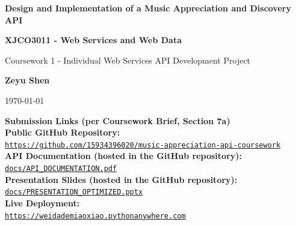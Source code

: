\documentclass[11pt,a4paper]{article}
\begin{document}
\begin{titlepage}
    \centering
    \vspace*{2cm}
    
    {\Huge\bfseries\color{primary} Design and Implementation of a Music Appreciation and Discovery API\par}
    \vspace{1.5cm}
    
    {\Large\bfseries XJCO3011 - Web Services and Web Data\par}
    \vspace{0.5cm}
    {\large Coursework 1 - Individual Web Services API Development Project\par}
    
    \vspace{2cm}
    
    {\Large\bfseries Zeyu Shen\par}
    \vspace{0.5cm}
    {\large \today\par}
    
    \vfill
    
    \begin{tcolorbox}[colback=white,colframe=secondary,boxrule=1pt,arc=4pt,width=0.92\textwidth,center]
    \centering
    \textbf{Submission Links (per Coursework Brief, Section 7a)}\\[4pt]
    \small
    \textbf{Public GitHub Repository:}\\
    \href{https://github.com/15934396020/music-appreciation-api-coursework}{\texttt{https://github.com/15934396020/music-appreciation-api-coursework}}\\[3pt]
    \textbf{API Documentation (hosted in the GitHub repository):}\\
    \href{https://github.com/15934396020/music-appreciation-api-coursework/blob/main/docs/API\_DOCUMENTATION.pdf}{\texttt{docs/API\_DOCUMENTATION.pdf}}\\[3pt]
    \textbf{Presentation Slides (hosted in the GitHub repository):}\\
    \href{https://github.com/15934396020/music-appreciation-api-coursework/blob/main/docs/PRESENTATION\_OPTIMIZED.pptx}{\texttt{docs/PRESENTATION\_OPTIMIZED.pptx}}\\[3pt]
    \textbf{Live Deployment:}\\
    \href{https://weidademiaoxiao.pythonanywhere.com}{\texttt{https://weidademiaoxiao.pythonanywhere.com}}
    \end{tcolorbox}
    
    \vspace{1cm}
\end{titlepage}
\end{document}
